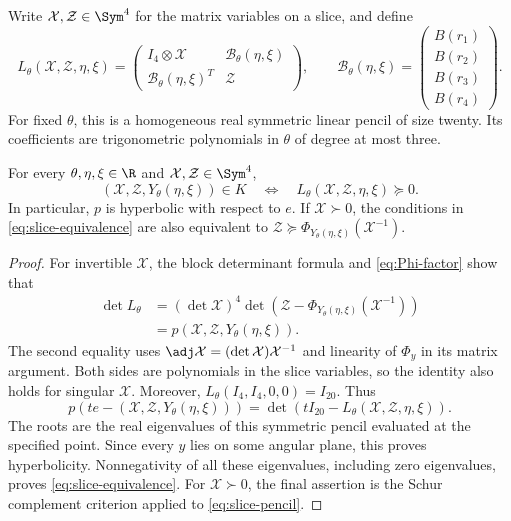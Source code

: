 Write $\mathcal X,\mathcal Z\in\Sym^4$ for the matrix variables on a
slice, and define
\begin{equation}\label{eq:slice-pencil}
 L_\theta(\mathcal X,\mathcal Z,\eta,\xi)
 =\begin{pmatrix}
 I_4\otimes\mathcal X&\mathcal B_\theta(\eta,\xi)\\
 \mathcal B_\theta(\eta,\xi)^T&\mathcal Z
 \end{pmatrix},
 \qquad
 \mathcal B_\theta(\eta,\xi)=
 \begin{pmatrix}B(r_1)\\B(r_2)\\B(r_3)\\B(r_4)\end{pmatrix}.
\end{equation}
For fixed $\theta$, this is a homogeneous real symmetric linear pencil
of size twenty. Its coefficients are trigonometric polynomials in
$\theta$ of degree at most three.

\begin{lemma}\label{lem:slice}
For every $\theta,\eta,\xi\in\R$ and
$\mathcal X,\mathcal Z\in\Sym^4$,
\begin{equation}\label{eq:slice-equivalence}
 (\mathcal X,\mathcal Z,Y_\theta(\eta,\xi))\in K
 \quad\Longleftrightarrow\quad
 L_\theta(\mathcal X,\mathcal Z,\eta,\xi)\succeq0.
\end{equation}
In particular, $p$ is hyperbolic with respect to $e$. If
$\mathcal X\succ0$, the conditions in \eqref{eq:slice-equivalence}
are also equivalent to
$\mathcal Z\succeq\Phi_{Y_\theta(\eta,\xi)}(\mathcal X^{-1})$.
\end{lemma}

\begin{proof}
For invertible $\mathcal X$, the block determinant formula and
\eqref{eq:Phi-factor} show that
\begin{align*}
 \det L_\theta
 &= (\det\mathcal X)^4
    \det\!\left(\mathcal Z-
        \Phi_{Y_\theta(\eta,\xi)}(\mathcal X^{-1})\right)\\
 &=p(\mathcal X,\mathcal Z,Y_\theta(\eta,\xi)).
\end{align*}
The second equality uses
$\adj\mathcal X=(\det\mathcal X)\mathcal X^{-1}$ and linearity of
$\Phi_y$ in its matrix argument. Both sides are polynomials in the
slice variables, so the identity also holds for singular $\mathcal X$.
Moreover, $L_\theta(I_4,I_4,0,0)=I_{20}$. Thus
\begin{equation}\label{eq:roots}
 p\!\left(te-(\mathcal X,\mathcal Z,Y_\theta(\eta,\xi))\right)
 =\det\!\left(tI_{20}-L_\theta(\mathcal X,\mathcal Z,\eta,\xi)\right).
\end{equation}
The roots are the real eigenvalues of this symmetric pencil evaluated
at the specified point. Since every $y$ lies on some angular plane,
this proves hyperbolicity. Nonnegativity of all these eigenvalues,
including zero eigenvalues, proves \eqref{eq:slice-equivalence}.
For $\mathcal X\succ0$, the final assertion is the Schur complement
criterion applied to \eqref{eq:slice-pencil}.
\end{proof}
